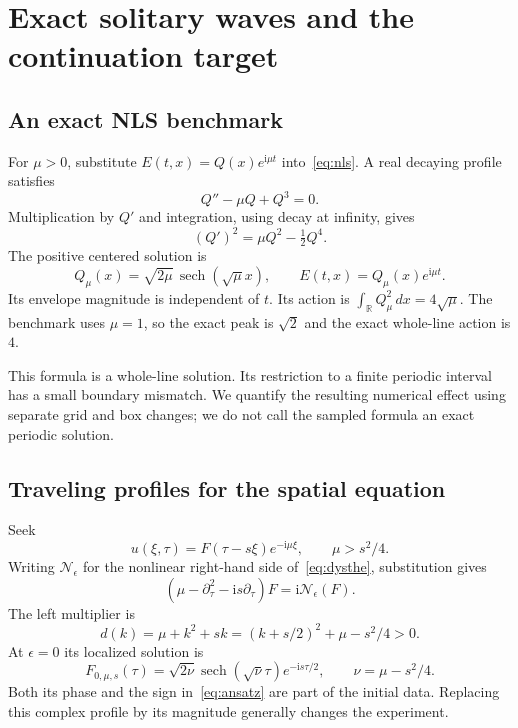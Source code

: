 \documentclass[10pt,letterpaper]{article}
\numberwithin{equation}{section}
\newcommand{\ii}{\mathrm{i}}
\newcommand{\R}{\mathbb R}
\begin{document}
\section{Exact solitary waves and the continuation target}
\subsection{An exact NLS benchmark}
For $\mu>0$, substitute $E(t,x)=Q(x)e^{\ii\mu t}$ into~\eqref{eq:nls}. A real decaying profile satisfies
\begin{equation}
 Q''-\mu Q+Q^3=0.
\end{equation}
Multiplication by $Q'$ and integration, using decay at infinity, gives
\begin{equation}
 (Q')^2=\mu Q^2-\tfrac12Q^4.
\end{equation}
The positive centered solution is
\begin{equation}\label{eq:exact}
 Q_\mu(x)=\sqrt{2\mu}\,\operatorname{sech}(\sqrt\mu x),\qquad
 E(t,x)=Q_\mu(x)e^{\ii\mu t}.
\end{equation}
Its envelope magnitude is independent of $t$. Its action is $\int_\R Q_\mu^2\,dx=4\sqrt\mu$. The benchmark uses $\mu=1$, so the exact peak is $\sqrt2$ and the exact whole-line action is $4$.

This formula is a whole-line solution. Its restriction to a finite periodic interval has a small boundary mismatch. We quantify the resulting numerical effect using separate grid and box changes; we do not call the sampled formula an exact periodic solution.

\subsection{Traveling profiles for the spatial equation}
Seek
\begin{equation}\label{eq:ansatz}
 u(\xi,\tau)=F(\tau-s\xi)e^{-\ii\mu\xi},\qquad \mu>s^2/4.
\end{equation}
Writing $\mathcal N_\epsilon$ for the nonlinear right-hand side of~\eqref{eq:dysthe}, substitution gives
\begin{equation}\label{eq:profile}
 (\mu-\partial_\tau^2-\ii s\partial_\tau)F
   =\ii\mathcal N_\epsilon(F).
\end{equation}
The left multiplier is
\begin{equation}
 d(k)=\mu+k^2+sk=(k+s/2)^2+\mu-s^2/4>0.
\end{equation}
At $\epsilon=0$ its localized solution is
\begin{equation}\label{eq:seed}
 F_{0,\mu,s}(\tau)=\sqrt{2\nu}\operatorname{sech}(\sqrt\nu\tau)
       e^{-\ii s\tau/2},\qquad \nu=\mu-s^2/4.
\end{equation}
Both its phase and the sign in~\eqref{eq:ansatz} are part of the initial data. Replacing this complex profile by its magnitude generally changes the experiment.
\end{document}
